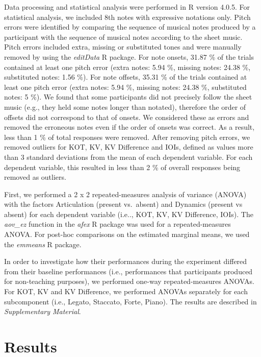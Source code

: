 \documentclass[
  man,floatsintext]{apa6}
\begin{document}
Data processing and statistical analysis were performed in R version 4.0.5. For statistical analysis, we included 8th notes with expressive notations only. Pitch errors were identified by comparing the sequence of musical notes produced by a participant with the sequence of musical notes according to the sheet music. Pitch errors included extra, missing or substituted tones and were manually removed by using the \emph{editData} R package. For note onsets, 31.87 \% of the trials contained at least one pitch error (extra notes: 5.94 \%, missing notes: 24.38 \%, substituted notes: 1.56 \%). For note offsets, 35.31 \% of the trials contained at least one pitch error (extra notes: 5.94 \%, missing notes: 24.38 \%, substituted notes: 5 \%). We found that some participants did not precisely follow the sheet music (e.g., they held some notes longer than notated), therefore the order of offsets did not correspond to that of onsets. We considered these as errors and removed the erroneous notes even if the order of onsets was correct. As a result, less than 1 \% of total responses were removed. After removing pitch errors, we removed outliers for KOT, KV, KV Difference and IOIs, defined as values more than 3 standard deviations from the mean of each dependent variable. For each dependent variable, this resulted in less than 2 \% of overall responses being removed as outliers.

First, we performed a 2 x 2 repeated-measures analysis of variance (ANOVA) with the factors Articulation (present vs.~absent) and Dynamics (present vs absent) for each dependent variable (i.e.., KOT, KV, KV Difference, IOIs). The \emph{aov\_ez} function in the \emph{afex} R package was used for a repeated-measures ANOVA. For post-hoc comparisons on the estimated marginal means, we used the \emph{emmeans} R package.

In order to investigate how their performances during the experiment differed from their baseline performances (i.e., performances that participants produced for non-teaching purposes), we performed one-way repeated-measures ANOVAs. For KOT, KV and KV Difference, we performed ANOVAs separately for each subcomponent (i.e., Legato, Staccato, Forte, Piano). The results are described in \emph{Supplementary Material}.

\hypertarget{results}{%
\section{Results}\label{results}}
\end{document}
